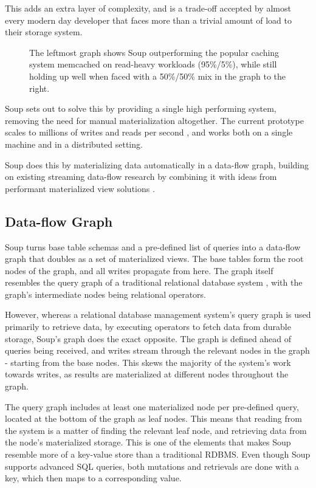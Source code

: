 \documentclass[b5paper]{report}
\begin{document}
This adds an extra layer of complexity, and is a trade-off accepted by almost
every modern day developer that faces more than a trivial amount of load to
their storage system.

\begin{figure}[H]
  \centering
  
  \caption{
    The leftmost graph shows Soup outperforming the popular caching system
    memcached on read-heavy workloads (95\%/5\%), while still holding up well
    when faced with a 50\%/50\% mix in the graph to the right.
  }
\end{figure}

Soup sets out to solve this by providing a single high performing system,
removing the need for manual materialization altogether. The current prototype
scales to millions of writes and reads per second \cite{soup}, and works both on
a single machine and in a distributed setting.

Soup does this by materializing data automatically in a data-flow
graph, building on existing streaming data-flow research \cite{naiad, dataflow}
by combining it with ideas from performant materialized view solutions
\cite{dbtoaster, pequod}.

\subsection{Data-flow Graph}
Soup turns base table schemas and a pre-defined list of queries into a data-flow
graph that doubles as a set of materialized views. The base tables form the
root nodes of the graph, and all writes propagate from here. The graph itself
resembles the query graph of a traditional relational database system
\cite{codd}, with the graph's intermediate nodes being relational operators.

However, whereas a relational database management system's query graph is used
primarily to retrieve data, by executing operators to fetch data from durable
storage, Soup's graph does the exact opposite. The graph is defined ahead of
queries being received, and writes stream through the relevant nodes in the
graph - starting from the base nodes. This skews the majority of the system's
work towards writes, as results are materialized at different nodes throughout
the graph.

The query graph includes at least one materialized node per pre-defined query,
located at the bottom of the graph as leaf nodes. This means that reading from
the system is a matter of finding the relevant leaf node, and retrieving data
from the node's materialized storage. This is one of the elements that makes Soup
resemble more of a key-value store than a traditional RDBMS. Even though Soup
supports advanced SQL queries, both mutations and retrievals are done with a
key, which then maps to a corresponding value.
\end{document}

